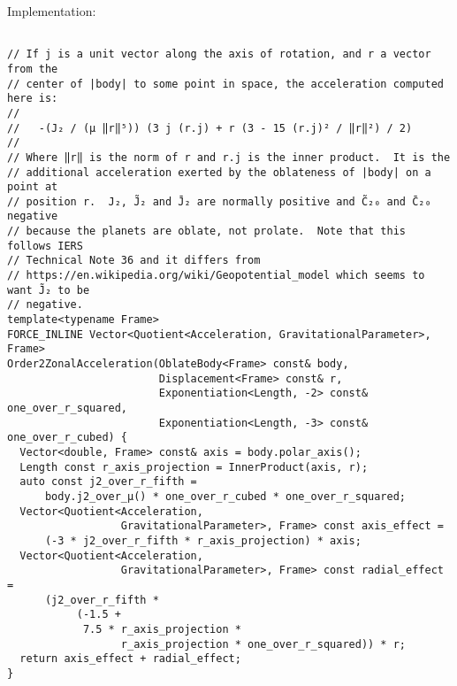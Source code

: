 \documentclass[10pt, a4paper, oneside]{basestyle}
\begin{document}
\noindent
Implementation:
{\small%
\begin{verbatim}

// If j is a unit vector along the axis of rotation, and r a vector from the
// center of |body| to some point in space, the acceleration computed here is:
//
//   -(J₂ / (μ ‖r‖⁵)) (3 j (r.j) + r (3 - 15 (r.j)² / ‖r‖²) / 2)
//
// Where ‖r‖ is the norm of r and r.j is the inner product.  It is the
// additional acceleration exerted by the oblateness of |body| on a point at
// position r.  J₂, J̃₂ and J̄₂ are normally positive and C̃₂₀ and C̄₂₀ negative
// because the planets are oblate, not prolate.  Note that this follows IERS
// Technical Note 36 and it differs from
// https://en.wikipedia.org/wiki/Geopotential_model which seems to want J̃₂ to be
// negative.
template<typename Frame>
FORCE_INLINE Vector<Quotient<Acceleration, GravitationalParameter>, Frame>
Order2ZonalAcceleration(OblateBody<Frame> const& body,
                        Displacement<Frame> const& r,
                        Exponentiation<Length, -2> const& one_over_r_squared,
                        Exponentiation<Length, -3> const& one_over_r_cubed) {
  Vector<double, Frame> const& axis = body.polar_axis();
  Length const r_axis_projection = InnerProduct(axis, r);
  auto const j2_over_r_fifth =
      body.j2_over_μ() * one_over_r_cubed * one_over_r_squared;
  Vector<Quotient<Acceleration,
                  GravitationalParameter>, Frame> const axis_effect =
      (-3 * j2_over_r_fifth * r_axis_projection) * axis;
  Vector<Quotient<Acceleration,
                  GravitationalParameter>, Frame> const radial_effect =
      (j2_over_r_fifth *
           (-1.5 +
            7.5 * r_axis_projection *
                  r_axis_projection * one_over_r_squared)) * r;
  return axis_effect + radial_effect;
}
\end{verbatim}%
}
\end{document}

